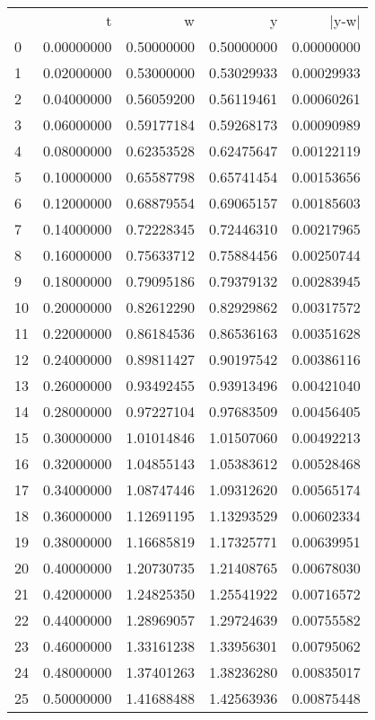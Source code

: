 \begin{tabular}{lrrrr}
 & t & w & y & |y-w| \\
0 & 0.00000000 & 0.50000000 & 0.50000000 & 0.00000000 \\
1 & 0.02000000 & 0.53000000 & 0.53029933 & 0.00029933 \\
2 & 0.04000000 & 0.56059200 & 0.56119461 & 0.00060261 \\
3 & 0.06000000 & 0.59177184 & 0.59268173 & 0.00090989 \\
4 & 0.08000000 & 0.62353528 & 0.62475647 & 0.00122119 \\
5 & 0.10000000 & 0.65587798 & 0.65741454 & 0.00153656 \\
6 & 0.12000000 & 0.68879554 & 0.69065157 & 0.00185603 \\
7 & 0.14000000 & 0.72228345 & 0.72446310 & 0.00217965 \\
8 & 0.16000000 & 0.75633712 & 0.75884456 & 0.00250744 \\
9 & 0.18000000 & 0.79095186 & 0.79379132 & 0.00283945 \\
10 & 0.20000000 & 0.82612290 & 0.82929862 & 0.00317572 \\
11 & 0.22000000 & 0.86184536 & 0.86536163 & 0.00351628 \\
12 & 0.24000000 & 0.89811427 & 0.90197542 & 0.00386116 \\
13 & 0.26000000 & 0.93492455 & 0.93913496 & 0.00421040 \\
14 & 0.28000000 & 0.97227104 & 0.97683509 & 0.00456405 \\
15 & 0.30000000 & 1.01014846 & 1.01507060 & 0.00492213 \\
16 & 0.32000000 & 1.04855143 & 1.05383612 & 0.00528468 \\
17 & 0.34000000 & 1.08747446 & 1.09312620 & 0.00565174 \\
18 & 0.36000000 & 1.12691195 & 1.13293529 & 0.00602334 \\
19 & 0.38000000 & 1.16685819 & 1.17325771 & 0.00639951 \\
20 & 0.40000000 & 1.20730735 & 1.21408765 & 0.00678030 \\
21 & 0.42000000 & 1.24825350 & 1.25541922 & 0.00716572 \\
22 & 0.44000000 & 1.28969057 & 1.29724639 & 0.00755582 \\
23 & 0.46000000 & 1.33161238 & 1.33956301 & 0.00795062 \\
24 & 0.48000000 & 1.37401263 & 1.38236280 & 0.00835017 \\
25 & 0.50000000 & 1.41688488 & 1.42563936 & 0.00875448 \\

\end{tabular}

